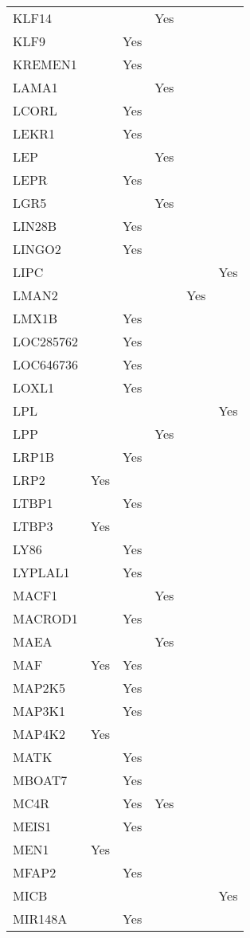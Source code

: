 \documentclass[twoside,openright]{report}
\begin{document}
\begin{appendices}
\begin{longtable}[t]{llllll}
KLF14 &  &  & Yes &  & \\
KLF9 &  & Yes &  &  & \\
KREMEN1 &  & Yes &  &  & \\
LAMA1 &  &  & Yes &  & \\
LCORL &  & Yes &  &  & \\
LEKR1 &  & Yes &  &  & \\
LEP &  &  & Yes &  & \\
LEPR &  & Yes &  &  & \\
LGR5 &  &  & Yes &  & \\
LIN28B &  & Yes &  &  & \\
LINGO2 &  & Yes &  &  & \\
LIPC &  &  &  &  & Yes\\
LMAN2 &  &  &  & Yes & \\
LMX1B &  & Yes &  &  & \\
LOC285762 &  & Yes &  &  & \\
LOC646736 &  & Yes &  &  & \\
LOXL1 &  & Yes &  &  & \\
LPL &  &  &  &  & Yes\\
LPP &  &  & Yes &  & \\
LRP1B &  & Yes &  &  & \\
LRP2 & Yes &  &  &  & \\
LTBP1 &  & Yes &  &  & \\
LTBP3 & Yes &  &  &  & \\
LY86 &  & Yes &  &  & \\
LYPLAL1 &  & Yes &  &  & \\
MACF1 &  &  & Yes &  & \\
MACROD1 &  & Yes &  &  & \\
MAEA &  &  & Yes &  & \\
MAF & Yes & Yes &  &  & \\
MAP2K5 &  & Yes &  &  & \\
MAP3K1 &  & Yes &  &  & \\
MAP4K2 & Yes &  &  &  & \\
MATK &  & Yes &  &  & \\
MBOAT7 &  & Yes &  &  & \\
MC4R &  & Yes & Yes &  & \\
MEIS1 &  & Yes &  &  & \\
MEN1 & Yes &  &  &  & \\
MFAP2 &  & Yes &  &  & \\
MICB &  &  &  &  & Yes\\
MIR148A &  & Yes &  &  & \\

\end{longtable}
\end{appendices}
\end{document}
